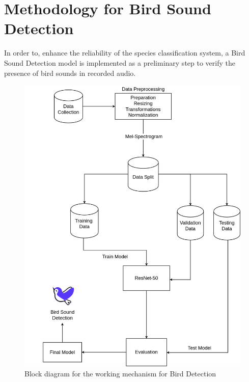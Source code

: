 \newpage
\section{Methodology for Bird Sound Detection}
In order to, enhance the reliability of the species classification system, a Bird Sound Detection model is implemented 
as a preliminary step to verify the
presence of bird sounds in recorded audio.
\begin{figure}[h!]
    \centering
    \includegraphics[scale=0.33]{images/DetectionMethodology.png}
    \caption{Block diagram for the working mechanism for Bird Detection}%
\end{figure} 
\newpage
